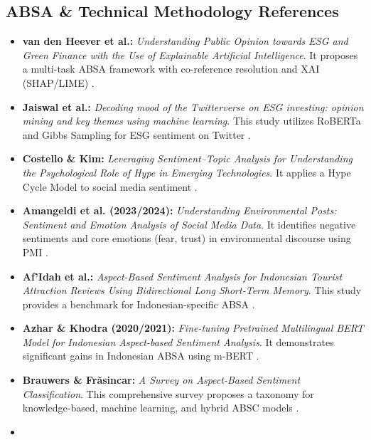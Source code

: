 \documentclass{article}
\begin{document}
\subsection*{ABSA \& Technical Methodology References}
\begin{itemize}
\item 

\textbf{van den Heever et al.:} \textit{Understanding Public Opinion towards ESG and Green Finance with the Use of Explainable Artificial Intelligence}. It proposes a multi-task ABSA framework with co-reference resolution and XAI (SHAP/LIME)  \parencite{wihan_van_der_heever_44c76c99}.\item 

\textbf{Jaiswal et al.:} \textit{Decoding mood of the Twitterverse on ESG investing: opinion mining and key themes using machine learning}. This study utilizes RoBERTa and Gibbs Sampling for ESG sentiment on Twitter  \parencite{rachana_jaiswal_8eee1b17}.\item 

\textbf{Costello \& Kim:} \textit{Leveraging Sentiment–Topic Analysis for Understanding the Psychological Role of Hype in Emerging Technologies}. It applies a Hype Cycle Model to social media sentiment  \parencite{francis_joseph_costello_043cfb4b}.\item 

\textbf{Amangeldi et al. (2023/2024):} \textit{Understanding Environmental Posts: Sentiment and Emotion Analysis of Social Media Data}. It identifies negative sentiments and core emotions (fear, trust) in environmental discourse using PMI  \parencite[]{daniyar_amangeldi_739b166b, daniyar_amangeldi_dfc2f315}.\item 

\textbf{Af’Idah et al.:} \textit{Aspect-Based Sentiment Analysis for Indonesian Tourist Attraction Reviews Using Bidirectional Long Short-Term Memory}. This study provides a benchmark for Indonesian-specific ABSA  \parencite{dwi_intan_af_idah_3c853c68}.\item 

\textbf{Azhar \& Khodra (2020/2021):} \textit{Fine-tuning Pretrained Multilingual BERT Model for Indonesian Aspect-based Sentiment Analysis}. It demonstrates significant gains in Indonesian ABSA using m-BERT  \parencite[]{annisa_nurul_azhar_598a3072, annisa_nurul_azhar_2e4c34b6}.\item 

\textbf{Brauwers \& Frăsincar:} \textit{A Survey on Aspect-Based Sentiment Classification}. This comprehensive survey proposes a taxonomy for knowledge-based, machine learning, and hybrid ABSC models  \parencite{gianni_brauwers_a5890333}.\item 


\end{itemize}
\end{document}
